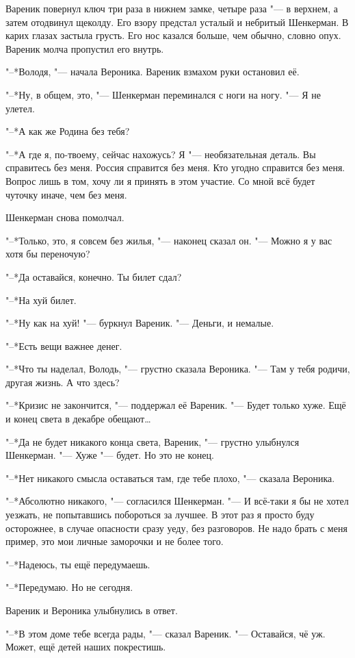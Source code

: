 Вареник повернул ключ три раза в нижнем замке, четыре раза "--- в верхнем, а затем отодвинул щеколду.
Его взору предстал усталый и небритый Шенкерман.
В карих глазах застыла грусть.
Его нос казался больше, чем обычно, словно опух.
Вареник молча пропустил его внутрь.

"--*Володя, "--- начала Вероника.
Вареник взмахом руки остановил её.

"--*Ну, в общем, это, "--- Шенкерман переминался с ноги на ногу.
"--- Я не улетел.

"--*А как же Родина без тебя?

"--*А где я, по-твоему, сейчас нахожусь?
Я "--- необязательная деталь.
Вы справитесь без меня.
Россия справится без меня.
Кто угодно справится без меня.
Вопрос лишь в том, хочу ли я принять в этом участие.
Со мной всё будет чуточку иначе, чем без меня.

Шенкерман снова помолчал.

"--*Только, это, я совсем без жилья, "--- наконец сказал он.
"--- Можно я у вас хотя бы переночую?

"--*Да оставайся, конечно.
Ты билет сдал?

"--*На хуй билет.

"--*Ну как на хуй! "--- буркнул Вареник.
"--- Деньги, и немалые.

"--*Есть вещи важнее денег.

"--*Что ты наделал, Володь, "--- грустно сказала Вероника.
"--- Там у тебя родичи, другая жизнь.
А что здесь?

"--*Кризис не закончится, "--- поддержал её Вареник.
"--- Будет только хуже.
Ещё и конец света в декабре обещают\ldots{}

"--*Да не будет никакого конца света, Вареник, "--- грустно улыбнулся Шенкерман.
"--- Хуже "--- будет.
Но это не конец.

"--*Нет никакого смысла оставаться там, где тебе плохо, "--- сказала Вероника.

"--*Абсолютно никакого, "--- согласился Шенкерман.
"--- И всё-таки я бы не хотел уезжать, не попытавшись побороться за лучшее.
В этот раз я просто буду осторожнее, в случае опасности сразу уеду, без разговоров.
Не надо брать с меня пример, это мои личные заморочки и не более того.

"--*Надеюсь, ты ещё передумаешь.

"--*Передумаю.
Но не сегодня.

Вареник и Вероника улыбнулись в ответ.

"--*В этом доме тебе всегда рады, "--- сказал Вареник.
"--- Оставайся, чё уж.
Может, ещё детей наших покрестишь.


